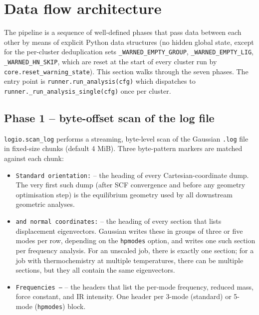 \documentclass[10pt,a4paper,twoside]{article}
\newcommand{\codref}[1]{%
  \quad\text{\textcolor{gray!70!black}{\footnotesize $\rightsquigarrow$~\texttt{#1}}}}
\newcommand{\fn}[1]{\texttt{#1}}
\newcommand{\file}[1]{\texttt{#1}}
\begin{document}
\section{Data flow architecture}
\label{sec:dataflow}

The pipeline is a sequence of well-defined phases that pass data
between each other by means of explicit Python data structures (no
hidden global state, except for the per-cluster deduplication sets
\fn{\_WARNED\_EMPTY\_GROUP}, \fn{\_WARNED\_EMPTY\_LIG},
\fn{\_WARNED\_HN\_SKIP}, which are reset at the start of every cluster
run by \fn{core.reset\_warning\_state}). This section walks through
the seven phases. The entry point is \fn{runner.run\_analysis(cfg)}
which dispatches to \fn{runner.\_run\_analysis\_single(cfg)} once per
cluster.

\subsection{Phase 1 -- byte-offset scan of the log file}
\label{sec:phase1-scan}

\codref{logio.scan\_log}

\fn{logio.scan\_log} performs a streaming, byte-level scan of the
Gaussian \file{.log} file in fixed-size chunks (default 4 MiB).
Three byte-pattern markers are matched against each chunk:

\begin{itemize}
  \item \texttt{Standard orientation:} -- the heading of every
        Cartesian-coordinate dump. The very first such dump (after
        SCF convergence and before any geometry optimisation step)
        is the equilibrium geometry used by all downstream
        geometric analyses.
  \item \texttt{and normal coordinates:} -- the heading of every
        section that lists displacement eigenvectors. Gaussian writes
        these in groups of three or five modes per row, depending on
        the \texttt{hpmodes} option, and writes one such section per
        frequency analysis. For an unscaled job, there is exactly one
        section; for a job with thermochemistry at multiple
        temperatures, there can be multiple sections, but they all
        contain the same eigenvectors.
  \item \texttt{Frequencies --} -- the headers that list the
        per-mode frequency, reduced mass, force constant, and IR
        intensity. One header per 3-mode (standard) or 5-mode
        (\texttt{hpmodes}) block.
\end{itemize}
\end{document}
